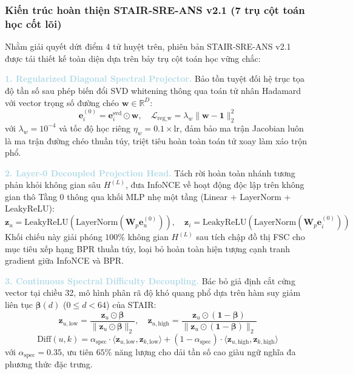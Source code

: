 \subsubsection{Kiến trúc hoàn thiện STAIR-SRE-ANS v2.1 (7 trụ cột toán học cốt lõi)}

Nhằm giải quyết dứt điểm 4 tử huyệt trên, phiên bản STAIR-SRE-ANS v2.1 được tái thiết kế toàn diện dựa trên bảy trụ cột toán học vững chắc:

\noindent\textcolor{lightblue}{\textbf{1. Regularized Diagonal Spectral Projector.}}
Bảo tồn tuyệt đối hệ trục tọa độ tần số sau phép biến đổi SVD whitening thông qua toán tử nhân Hadamard với vector trọng số đường chéo $\mathbf{w} \in \mathbb{R}^D$:
\begin{equation}
\mathbf{e}_i^{(0)} = \mathbf{e}_i^{\text{svd}} \odot \mathbf{w}, \quad \mathcal{L}_{\text{reg\_w}} = \lambda_w \|\mathbf{w} - \mathbf{1}\|_2^2
\end{equation}
với $\lambda_w = 10^{-4}$ và tốc độ học riêng $\eta_w = 0.1 \times \text{lr}$, đảm bảo ma trận Jacobian luôn là ma trận đường chéo thuần túy, triệt tiêu hoàn toàn toán tử xoay làm xáo trộn phổ.

\noindent\textcolor{lightblue}{\textbf{2. Layer-0 Decoupled Projection Head.}}
Tách rời hoàn toàn nhánh tương phản khỏi không gian sâu $H^{(L)}$, đưa InfoNCE về hoạt động độc lập trên không gian thô Tầng 0 thông qua khối MLP nhẹ một tầng (Linear + LayerNorm + LeakyReLU):
\begin{equation}
\mathbf{z}_u = \text{LeakyReLU}(\text{LayerNorm}(\mathbf{W}_p \mathbf{e}_u^{(0)})), \quad \mathbf{z}_i = \text{LeakyReLU}(\text{LayerNorm}(\mathbf{W}_p \mathbf{e}_i^{(0)}))
\end{equation}
Khối chiếu này giải phóng $100\%$ không gian $H^{(L)}$ sau tích chập đồ thị FSC cho mục tiêu xếp hạng BPR thuần túy, loại bỏ hoàn toàn hiện tượng cạnh tranh gradient giữa InfoNCE và BPR.

\noindent\textcolor{lightblue}{\textbf{3. Continuous Spectral Difficulty Decoupling.}}
Bác bỏ giả định cắt cứng vector tại chiều 32, mô hình phân rã độ khó quang phổ dựa trên hàm suy giảm liên tục $\boldsymbol{\beta}(d)$ ($0 \le d < 64$) của STAIR:
\begin{equation}
\mathbf{z}_{u, \text{low}} = \frac{\mathbf{z}_u \odot \boldsymbol{\beta}}{\|\mathbf{z}_u \odot \boldsymbol{\beta}\|_2}, \quad \mathbf{z}_{u, \text{high}} = \frac{\mathbf{z}_u \odot (\mathbf{1} - \boldsymbol{\beta})}{\|\mathbf{z}_u \odot (\mathbf{1} - \boldsymbol{\beta})\|_2}
\end{equation}
\begin{equation}
\text{Diff}(u, k) = \alpha_{\text{spec}} \cdot \langle \mathbf{z}_{u, \text{low}}, \mathbf{z}_{k, \text{low}} \rangle + (1 - \alpha_{\text{spec}}) \cdot \langle \mathbf{z}_{u, \text{high}}, \mathbf{z}_{k, \text{high}} \rangle
\end{equation}
với $\alpha_{\text{spec}} = 0.35$, ưu tiên $65\%$ năng lượng cho dải tần số cao giàu ngữ nghĩa đa phương thức đặc trưng.

